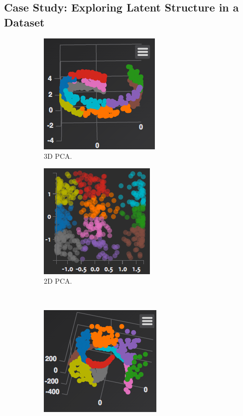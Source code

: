 \documentclass{sigchi}
\begin{document}
\subsection{Case Study: Exploring Latent Structure in a Dataset}
%
\begin{figure}
\centering
\begin{subfigure}{.49\columnwidth}
  \centering
  \includegraphics[width=.5\columnwidth]{figures/pca_3d_swiss}
  \caption{3D PCA.}
\end{subfigure}%
\begin{subfigure}{.49\columnwidth}
  \centering
  \includegraphics[width=.5\columnwidth]{figures/PCA_2d_roll}
  \caption{2D PCA.}
\end{subfigure}%
\\%
\begin{subfigure}{.49\columnwidth}
  \centering
  \includegraphics[width=.5\columnwidth]{figures/MDS_3d}

\end{subfigure}
\end{figure}
\end{document}
